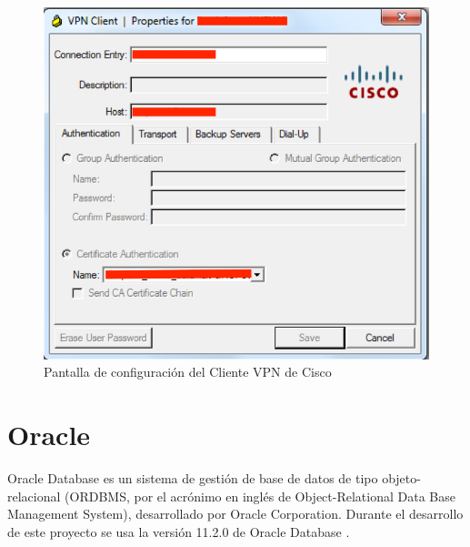 \documentclass[a4paper, 12pt]{book}
\begin{document}
\begin{figure}
   \centering
   \includegraphics[width=12cm, keepaspectratio]{img/ciscovpnclient}
   \caption{Pantalla de configuración del Cliente VPN de Cisco}
   \label{fig:CiscoVpnClient_Config}
\end{figure}

\section{Oracle}
\label{sec:Oracle}
Oracle Database es un sistema de gestión de base de datos de tipo objeto-relacional (ORDBMS, por el acrónimo en inglés de Object-Relational Data Base Management System), desarrollado por Oracle Corporation. Durante el desarrollo de este proyecto se usa la versión 11.2.0 de Oracle Database \cite{Ashdown_oracle}.
\end{document}
